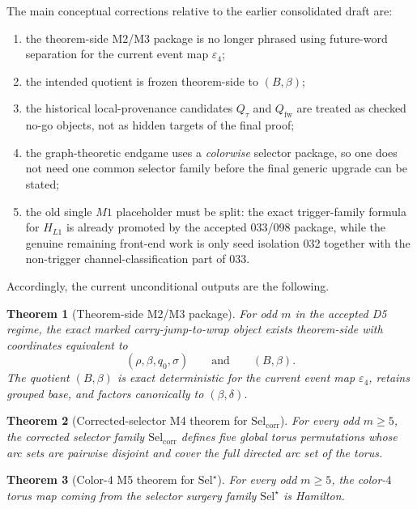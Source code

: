 \documentclass[11pt]{article}
\newtheorem{theorem}{Theorem}[section]
\newcommand{\SelCorr}{\mathrm{Sel}_{\mathrm{corr}}}
\newcommand{\SelStar}{\mathrm{Sel}^{\star}}
\newcommand{\eps}{\varepsilon}
\begin{document}
The main conceptual corrections relative to the earlier consolidated draft are:
\begin{enumerate}[label=\textup{(\alph*)},leftmargin=2.5em]
\item the theorem-side M2/M3 package is no longer phrased using future-word
      separation for the current event map $\eps_4$;
\item the intended quotient is frozen theorem-side to $(B,\beta)$;
\item the historical local-provenance candidates $Q_{\tau}$ and
      $Q_{\mathrm{fw}}$ are treated as checked no-go objects, not as hidden
      targets of the final proof;
\item the graph-theoretic endgame uses a \emph{colorwise} selector package,
      so one does not need one common selector family before the final generic
      upgrade can be stated;
\item the old single $M1$ placeholder must be split: the exact trigger-family
      formula for $H_{L1}$ is already promoted by the accepted
      \textup{033}/\textup{098} package, while the genuine remaining front-end
      work is only seed isolation \textup{032} together with the non-trigger
      channel-classification part of \textup{033}.
\end{enumerate}

Accordingly, the current unconditional outputs are the following.

\begin{theorem}[Theorem-side M2/M3 package]
For odd $m$ in the accepted D5 regime, the exact marked carry-jump-to-wrap
object exists theorem-side with coordinates equivalent to
\[
(\rho,\beta,q_0,\sigma)
\qquad\text{and}\qquad
(B,\beta).
\]
The quotient $(B,\beta)$ is exact deterministic for the current event map
$\eps_4$, retains grouped base, and factors canonically to $(\beta,\delta)$.
\end{theorem}

\begin{theorem}[Corrected-selector M4 theorem for $\SelCorr$]
For every odd $m\ge 5$, the corrected selector family $\SelCorr$ defines five
global torus permutations whose arc sets are pairwise disjoint and cover the
full directed arc set of the torus.
\end{theorem}

\begin{theorem}[Color-$4$ M5 theorem for $\SelStar$]
For every odd $m\ge 5$, the color-$4$ torus map coming from the selector
surgery family $\SelStar$ is Hamilton.
\end{theorem}
\end{document}
